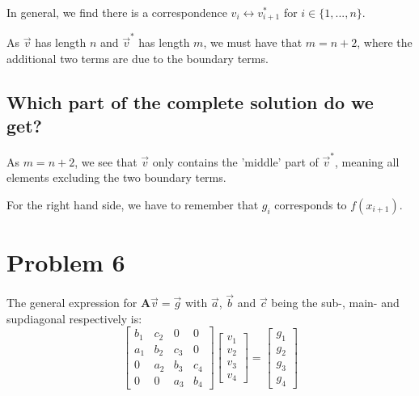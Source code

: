 \documentclass[english,notitlepage]{article}  %
\begin{document}

    In general, we find there is a correspondence $v_i \longleftrightarrow v^*_{i+1}$ for $i \in \{1, ..., n\}$.

    As $\vec{v}$ has length $n$ and $\vec{v}^*$ has length $m$, we must have that $m = n+2$, where the additional two terms are due to the boundary terms.


  \subsection*{Which part of the complete solution do we get?}

    As $m = n+2$, we see that $\vec{v}$ only contains the 'middle' part of $\vec{v}^*$, meaning all elements excluding the two boundary terms.

    For the right hand side, we have to remember that $g_i$ corresponds to $f(x_{i+1})$.

\section*{Problem 6}

    The general expression for $\boldsymbol{A}\vec{v} = \vec{g}$ with $\vec{a}$, $\vec{b}$ and $\vec{c}$ being the sub-, main- and supdiagonal respectively is:
    \begin{equation}\label{eq:mat_Avg}
        \begin{bmatrix}
            b_1 & c_2 & 0 & 0 \\
            a_1 & b_2 & c_3 & 0 \\
            0 & a_2 & b_3 & c_4 \\
            0 & 0 & a_3 & b_4
        \end{bmatrix} \begin{bmatrix}
            v_1\\
            v_2\\
            v_3\\
            v_4
        \end{bmatrix} = \begin{bmatrix}
            g_1\\
            g_2\\
            g_3\\
            g_4
        \end{bmatrix}
    \end{equation}
\end{document}
